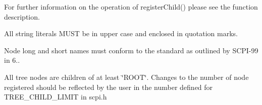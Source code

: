 For further information on the operation of register\-Child() please see the function description.

All string literals M\-U\-S\-T be in upper case and enclosed in quotation marks.

Node long and short names must conform to the standard as outlined by S\-C\-P\-I-\/99 in 6..

All tree nodes are children of at least \char`\"{}\-R\-O\-O\-T\char`\"{}. Changes to the number of node registered should be reflected by the user in the number defined for T\-R\-E\-E\-\_\-\-C\-H\-I\-L\-D\-\_\-\-L\-I\-M\-I\-T in scpi.\-h 
